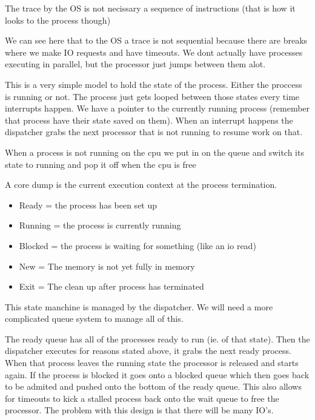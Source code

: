 \documentclass[12pt]{article}
\begin{document}














The trace by the OS is not necissary a sequence of instructions (that is how it looks to the process though)



We can see here that to the OS a trace is not sequential because there are breaks where we make IO requests and have timeouts. We dont actually have processes executing in parallel, but the processor just jumps between them alot.

This is a very simple model to hold the state of the process. Either the proccess is running or not. The process just gets looped between those states every time interrupts happen. We have a pointer to the currently running process (remember that process have their state saved on them). When an interrupt happens the dispatcher grabs the next processor that is not running to resume work on that.

When a process is not running on the cpu we put in on the queue and switch its state to running and pop it off when the cpu is free


A core dump is the current execution context at the process termination.




\begin{itemize}
    \item Ready = the process has been set up
    \item Running = the process is currently running
    \item Blocked = the process is waiting for something (like an io read)
    \item New = The memory is not yet fully in memory
    \item Exit = The clean up after process has terminated
\end{itemize}
This state manchine is managed by the dispatcher. We will need a more complicated queue system to manage all of this.



The ready queue has all of the processes ready to run (ie. of that state). Then the dispatcher executes for reasons stated above, it grabs the next ready process. When that process leaves the running state the processor is released and starts again. If the process is blocked it goes onto a blocked queue which then goes back to be admited and pushed onto the bottom of the ready queue. This also allows for timeouts to kick a stalled process back onto the wait queue to free the processor. The problem with this design is that there will be many IO's.
\end{document}
